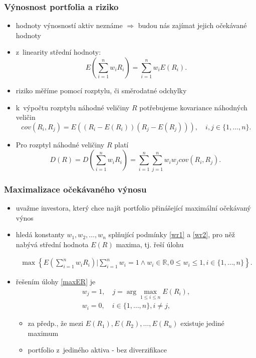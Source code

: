     \begin{frame}
    \frametitle{Výnosnost portfolia a riziko }
 \begin{itemize}
\item  hodnoty výnosností aktiv neznáme $\Rightarrow$ budou nás zajímat jejich očekávané hodnoty
\item  z~linearity střední hodnoty:
\begin{equation}
E\left(\sum_{i=1}^n w_iR_i\right)=\sum_{i=1}^n w_iE(R_i). \label{ER}
\end{equation}
\item riziko měříme pomocí rozptylu, či směrodatné odchylky
\item k~výpočtu rozptylu náhodné veličiny $R$ potřebujeme kovariance náhodných veličin
\[
cov(R_i, R_j)=E\left( \left(R_i - E(R_i) \right)\left(R_j - E(R_j) \right)\right), \quad i,j \in \{1,\dots, n\}.
\]
\item Pro rozptyl náhodné veličiny $R$ platí
\[
D(R)=D\left(\sum_{i=1}^n w_iR_i\right)=\sum_{i=1}^n \sum_{j=1}^n w_iw_jcov(R_i,R_j).\
\]
\end{itemize}
    
    \end{frame}
\begin{frame}
\frametitle{Maximalizace očekávaného výnosu}
\begin{itemize}
\item  uvažme investora, který chce najít portfolio přinášející maximální očekávaný výnos
\item hledá konstanty $w_1,w_2,\dots,w_n$ splňující podmínky \eqref{wr1} a \eqref{wr2}, pro něž nabývá střední hodnota $E(R)$ maxima, tj. řeší úlohu

\small{
\begin{gather} 
\max\left\{ E\left(\sum_{i=1}^n w_iR_i\right) \bigg| \sum_{i=1}^n w_i = 1 \wedge w_i \in \mathbb{R}, 0 \leq w_i \leq 1, i\in\{1,\dots,n\} \right\}. \label{maxER}
\end{gather}}

\item řešením úlohy \eqref{maxER} je
\begin{gather*}
w_j=1,\quad j=\arg \max_{1 \leq i \leq n} E(R_i), \\
w_i=0,\quad i\in\{1,\dots,n\}, i \neq j, 
\end{gather*}
\begin{itemize}
\item  za předp., že mezi $E(R_1),E(R_2),\dots,E(R_n)$ existuje jediné maximum
\item  portfolio z~jediného aktiva - bez diverzifikace
\end{itemize}
\end{itemize}
\end{frame}

